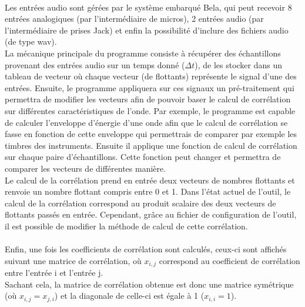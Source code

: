 \documentclass{article}
\begin{document}
\paragraph{}
Les entrées audio sont gérées par le système embarqué Bela, qui peut
recevoir 8 entrées analogiques (par l'intermédiaire de micros), 2 entrées
audio (par l'intermédiaire de prises Jack) et enfin la possibilité d'inclure
des fichiers audio (de type wav).\\
La mécanique principale du programme consiste à récupérer des échantillons
provenant des entrées audio sur un temps donné ($\Delta t$), de les stocker dans
un tableau de vecteur où chaque vecteur (de flottants) représente le signal d'une des entrées.
Ensuite, le programme appliquera sur ces signaux un pré-traitement qui permettra
de modifier les vecteurs afin de pouvoir baser le calcul de corrélation sur différentes
caractéristiques de l'onde. Par exemple, le programme est capable de calculer
l'enveloppe d’énergie d'une onde afin que le calcul de corrélation se fasse en fonction
de cette enveloppe qui permettrais de comparer par exemple les timbres des instruments.
Ensuite il applique une fonction de calcul de corrélation sur chaque paire d'échantillons.
Cette fonction peut changer et permettra de comparer les vecteurs de différentes manière.
\\
Le calcul de la corrélation prend en entrée deux vecteurs de
nombres flottants et renvoie un nombre flottant compris entre 0 et 1.
Dans l'état actuel de l'outil, le calcul de la corrélation correspond au
produit scalaire des deux vecteurs de flottants passés en entrée. Cependant,
grâce au fichier de configuration de l'outil, il est possible de modifier la
méthode de calcul de cette corrélation.
\paragraph{}
Enfin, une fois les coefficients de corrélation sont calculés, ceux-ci sont
affichés suivant une matrice de corrélation, où $x_{i,j}$ correspond au
coefficient de corrélation entre l'entrée i et l'entrée j.\\
Sachant cela, la matrice de corrélation obtenue est donc une matrice
symétrique (où $x_{i,j} = x_{j,i}$) et la diagonale de celle-ci est égale à
1 ($x_{i,i} = 1$).
\end{document}
